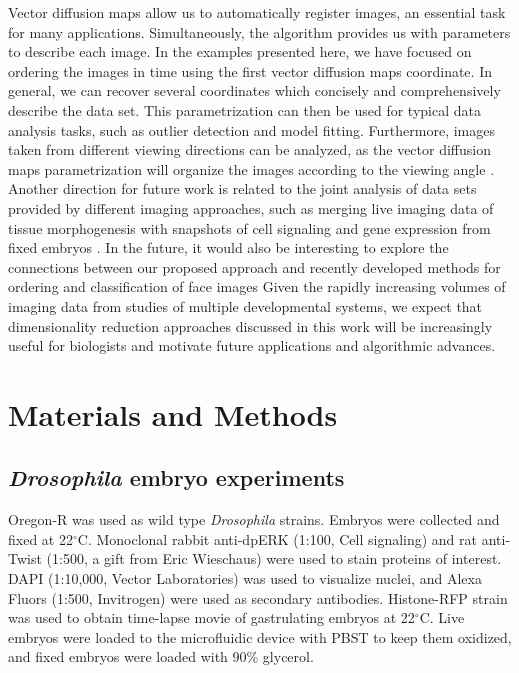 \documentclass[twocolumn, 10pt]{article}
\begin{document}
%
Vector diffusion maps allow us to automatically register images, an essential task for many applications.
%
Simultaneously, the algorithm provides us with parameters to describe each image.
%
In the examples presented here, we have focused on ordering the images in time using the first vector diffusion maps coordinate.
%
In general, we can recover several coordinates which concisely and comprehensively describe the data set.
%
This parametrization can then be used for typical data analysis tasks, such as outlier detection and model fitting.
%
%
Furthermore, images taken from different viewing directions can be analyzed, as the vector diffusion maps parametrization will organize the images according to the viewing angle \citep{singer2011viewing}.
%
Another direction for future work is related to the joint analysis of data sets provided by different imaging approaches, such as merging live imaging data of tissue morphogenesis with snapshots of cell signaling and gene expression from fixed embryos \citep{krzic2012multiview, ichikawa2014live, rubel2010coupling, dsilva2013nonlinear}.
%
In the future, it would also be interesting to explore the connections between our proposed approach and recently developed methods for ordering and classification of face images \citep{kemelmacher2011exploring, kemelmacher2014illumination}
%
Given the rapidly increasing volumes of imaging data from studies of multiple developmental systems, we expect that dimensionality reduction approaches discussed in this work will be increasingly useful for biologists and motivate future applications and algorithmic advances.






\section*{Materials and Methods}

\subsection*{{\em Drosophila} embryo experiments}
%
Oregon-R was used as wild type {\em Drosophila} strains.
%
Embryos were collected and fixed at 22$^\circ$C.
%
Monoclonal rabbit anti-dpERK (1:100, Cell signaling) and rat anti-Twist (1:500, a gift from Eric Wieschaus) were used to stain proteins of interest.
%
DAPI (1:10,000, Vector Laboratories) was used to visualize nuclei, and Alexa Fluors (1:500, Invitrogen) were used as secondary antibodies.
%
Histone-RFP strain was used to obtain time-lapse movie of gastrulating embryos at 22$^\circ$C.
%
Live embryos were loaded to the microfluidic device with PBST to keep them oxidized, and fixed embryos were loaded with 90\% glycerol.
\end{document}
